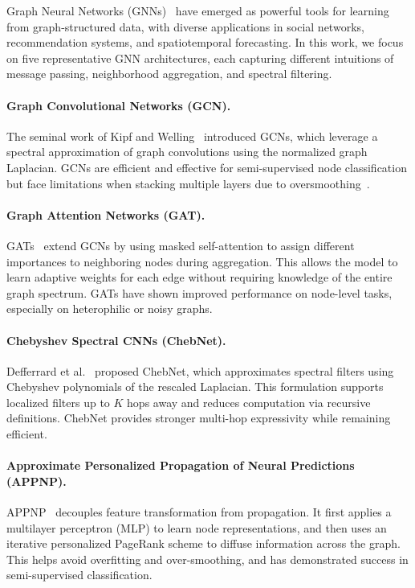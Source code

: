 \documentclass[runningheads]{llncs}
\begin{document}
Graph Neural Networks (GNNs)~\cite{zhong2023hierarchical} have emerged as powerful tools for learning from graph-structured data, with diverse applications in social networks, recommendation systems, and spatiotemporal forecasting. In this work, we focus on five representative GNN architectures, each capturing different intuitions of message passing, neighborhood aggregation, and spectral filtering.
\paragraph{Graph Convolutional Networks (GCN).}
The seminal work of Kipf and Welling~\cite{kipf2016semi} introduced GCNs, which leverage a spectral approximation of graph convolutions using the normalized graph Laplacian. GCNs are efficient and effective for semi-supervised node classification but face limitations when stacking multiple layers due to oversmoothing~\cite{wu2023demystifying}.
\paragraph{Graph Attention Networks (GAT).}
GATs~\cite{velivckovic2017graph} extend GCNs by using masked self-attention to assign different importances to neighboring nodes during aggregation. This allows the model to learn adaptive weights for each edge without requiring knowledge of the entire graph spectrum. GATs have shown improved performance on node-level tasks, especially on heterophilic or noisy graphs.
\paragraph{Chebyshev Spectral CNNs (ChebNet).}
Defferrard et al.~\cite{defferrard2016convolutional} proposed ChebNet, which approximates spectral filters using Chebyshev polynomials of the rescaled Laplacian. This formulation supports localized filters up to $K$ hops away and reduces computation via recursive definitions. ChebNet provides stronger multi-hop expressivity while remaining efficient.
\paragraph{Approximate Personalized Propagation of Neural Predictions (APPNP).}
APPNP~\cite{gasteiger2018predict} decouples feature transformation from propagation. It first applies a multilayer perceptron (MLP) to learn node representations, and then uses an iterative personalized PageRank scheme to diffuse information across the graph. This helps avoid overfitting and over-smoothing, and has demonstrated success in semi-supervised classification.
\end{document}
